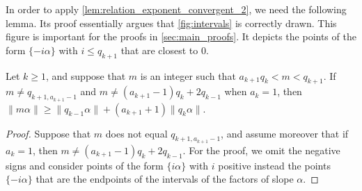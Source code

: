 \documentclass[a4paper,fleqn]{article}
\providecommand{\norm}[1]{\lVert#1\rVert}
\begin{document}
  In order to apply \autoref{lem:relation_exponent_convergent_2}, we need the following lemma. Its proof essentially
  argues that \autoref{fig:intervals} is correctly drawn. This figure is important for the proofs in
  \autoref{sec:main_proofs}. It depicts the points of the form $\{-i\alpha\}$ with $i \leq q_{k+1}$ that are closest to
  $0$.

  \begin{lemma}\label{lem:larger_lower_bound}
    Let $k \geq 1$, and suppose that $m$ is an integer such that $a_{k+1}q_k < m < q_{k+1}$. If
    $m \neq q_{k+1,a_{k+1}-1}$ and $m \neq (a_{k+1}-1)q_k + 2q_{k-1}$ when $a_k = 1$, then
    $\norm{m\alpha} \geq \norm{q_{k-1}\alpha} + (a_{k+1} + 1)\norm{q_k\alpha}$.
  \end{lemma}
  \begin{proof}
    Suppose that $m$ does not equal $q_{k+1,a_{k+1}-1}$, and assume moreover that if $a_k = 1$, then
    $m \neq (a_{k+1}-1)q_k + 2q_{k-1}$. For the proof, we omit the negative signs and consider points of the form
    $\{i\alpha\}$ with $i$ positive instead the points $\{-i\alpha\}$ that are the endpoints of the intervals of the
    factors of slope $\alpha$.


\end{proof}
\end{document}
